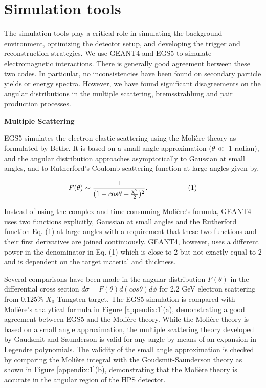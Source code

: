 \appendix
\section{Simulation tools}

The simulation tools play a critical role in simulating the background
environment, optimizing the detector setup, and developing the trigger 
and reconstruction strategies. We use GEANT4 and EGS5 to simulate 
electromagnetic interactions. There is generally good agreement 
between these two codes. In particular, no inconsistencies have been 
found on secondary particle yields or energy spectra. However, we have found 
significant disagreements on the angular distributions in the multiple
scattering, bremsstrahlung and pair production processes.  

\vspace{1cm}
\noindent
{\bf Multiple Scattering}

EGS5 simulates the electron elastic scattering using the Moli\`{e}re theory 
\cite{moliere} as formulated by Bethe. \cite{bethe}
It is based on a small angle approximation
($\theta \ll$ 1 radian), and the angular distribution approaches asymptotically
to Gaussian at small angles, and to Rutherford's Coulomb scattering function at 
large angles given by, 

$$ F(\theta) \sim  { 1 \over {(1-cos\theta + {\chi^2 \over 2})^2}}.    \hspace{2 cm} (1) $$

Instead of using the complex and time consuming Moli\`{e}re's formula,
GEANT4 uses two functions explicitly, Gaussian at small angles and the
Rutherford function Eq. (1) at large angles with a requirement that these two
functions and their first derivatives are joined continuously. 
GEANT4, however, uses a different power
in the denominator in Eq. (1) which is close to 2 but not exactly equal to 2 and is 
dependent on the target material and thickness.

Several comparisons have been made in the angular distribution $F(\theta)$ in the
differential cross section $d\sigma=F(\theta)d(cos\theta) d\phi$ for 2.2 GeV electron
scattering from 0.125\% $X_0$ Tungsten target. 
The EGS5 simulation is compared with Moli\`{e}re's analytical formula 
in Figure \ref{appendix:1}(a), demonstrating a good agreement between EGS5 and
the Moli\`{e}re theory.
While the Moli\`{e}re theory is based on a small angle approximation,
the multiple scattering theory developed by Gaudsmit and Saunderson is valid 
for any angle by means of an expansion in Legendre polynomials. \cite{gs}
The validity of the small angle approximation is checked by comparing the 
Moli\`{e}re integral with 
the Goudsmit-Saunderson theory as shown in Figure \ref{appendix:1}(b),
demonstrating that the Moli\`{e}re theory is accurate in the angular region
of the HPS detector. 

